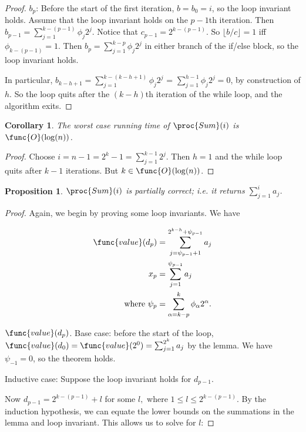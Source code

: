 \documentclass[11pt, answers]{exam}
\theoremstyle{plain}
\newtheorem{corollary}{Corollary}
\newtheorem{proposition}{Proposition}
\theoremstyle{definition}
\begin{document}
\begin{questions}
\begin{parts}
\begin{solution}
\begin{proof}
$b_p$: Before the start of the first iteration, $b = b_0 = i$, so the loop invariant holds. 
Assume that the loop invariant holds on the $p-1$th iteration. Then $b_{p-1} = \sum_{j = 1}^{k-(p-1)}\phi_j 2^j$. Notice that $c_{p-1} =  2^{k-(p-1)}$. So $\lfloor b/c \rfloor = 1$ iff $\phi_{k-(p-1)} = 1$. Then $b_p =\sum_{j = 1}^{k-p}\phi_j 2^j$ in either branch of the if/else block, so the loop invariant holds.

In particular, $b_{k-h +1} = \sum_{j = 1}^{k-(k-h+1)}\phi_j 2^j$ = $\sum_{j = 1}^{h-1}\phi_j 2^j = 0$, by construction of $h$. So the loop quits after the $(k-h)$th iteration of the while loop, and the algorithm exits.
 
\end{proof}

\begin{corollary} \label{runtime1}
The worst case running time of $\proc{Sum}(i)$ is $\func{O}(\log(n))$.
\end{corollary}

\begin{proof}
Choose $i = n - 1 = 2^k -1 = \sum_{j=1}^{k-1}2^j$. Then $h = 1$ and the while loop quits after $k-1$ iterations. But $k \in \func{O}(\log(n))$.
\end{proof}

\begin{proposition}
$\proc{Sum}(i)$ is partially correct; i.e. it returns $\sum_{j=1}^{i}a_j$.
\end{proposition}

\begin{proof}
Again, we begin by proving some loop invariants. We have

\begin{align*}
\func{value}(d_p) &= \sum_{j=\psi_{p-1} + 1}^{2^{k-h} + \psi_{p-1}}a_j \\
x_p &= \sum_{j=1}^{\psi_{p-1}}a_j \\
\text{where  } \psi_p &= \sum_{\alpha = k-p}^{k}\phi_{\alpha}2^{\alpha}.
\end{align*}

$\func{value}(d_p)$. Base case: before the start of the loop, $\func{value}(d_0) = \func{value}(2^0)= \sum_{j = 1}^{2^{k}}a_j$ by the lemma. We have $\psi_{-1} = 0$, so the theorem holds. 

Inductive case: Suppose the loop invariant holds for $d_{p-1}$. 

Now $d_{p-1} = 2^{k-(p-1)}+ \mathit{l}$ for some $\mathit{l} ,$ where $ 1 \leq \mathit{l} \leq 2^{k-(p-1)}$. By the induction hypothesis, we can equate the lower bounds on the summations in the lemma and loop invariant. This allows us to solve for $\mathit{l}$:


\end{proof}
\end{solution}
\end{parts}
\end{questions}
\end{document}
